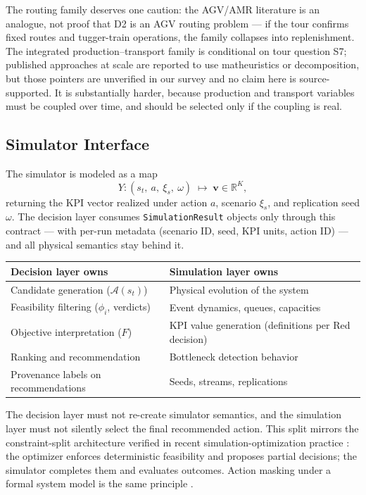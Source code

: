 \documentclass[11pt,a4paper]{article}
\newcommand{\Acal}{\mathcal{A}}
\begin{document}
The routing family deserves one caution: the AGV/AMR literature
\cite{leanh2006agv,fragapane2021amr} is an analogue, not proof that D2 is an
AGV routing problem --- if the tour confirms fixed routes and tugger-train
operations, the family collapses into replenishment. The integrated
production--transport family is conditional on tour question S7; published
approaches at scale are reported to use matheuristics or decomposition, but
those pointers are unverified in our survey and no claim here is
source-supported. It is substantially harder, because production and
transport variables must be coupled over time, and should be selected only
if the coupling is real.

\subsection{Simulator Interface}\label{sec:interface}

The simulator is modeled as a map
\begin{equation}\label{eq:simulator}
Y : (s_t,\ a,\ \xi_s,\ \omega) \;\longmapsto\; \mathbf{v} \in \mathbb{R}^{K},
\end{equation}
returning the KPI vector realized under action $a$, scenario $\xi_s$, and
replication seed $\omega$. The decision layer consumes
\texttt{SimulationResult} objects only through this contract --- with
per-run metadata (scenario ID, seed, KPI units, action ID) --- and all
physical semantics stay behind it.

\begin{center}
\small
\begin{tabular}{@{}p{7.2cm}p{7.2cm}@{}}
\toprule
\textbf{Decision layer owns} & \textbf{Simulation layer owns} \\
\midrule
Candidate generation ($\Acal(s_t)$) & Physical evolution of the system \\
Feasibility filtering ($\phi_i$, verdicts) & Event dynamics, queues,
capacities \\
Objective interpretation ($F$) & KPI value generation (definitions per Red
decision) \\
Ranking and recommendation & Bottleneck detection behavior \\
Provenance labels on recommendations & Seeds, streams, replications \\
\bottomrule
\end{tabular}
\end{center}

The decision layer must not re-create simulator semantics, and the
simulation layer must not silently select the final recommended action. This
split mirrors the constraint-split architecture verified in recent
simulation-optimization practice \cite{ghaedyheidary2024simopt}: the
optimizer enforces deterministic feasibility and proposes partial decisions;
the simulator completes them and evaluates outcomes. Action masking under a
formal system model is the same principle \cite{lassoued2025fms}.
\end{document}
